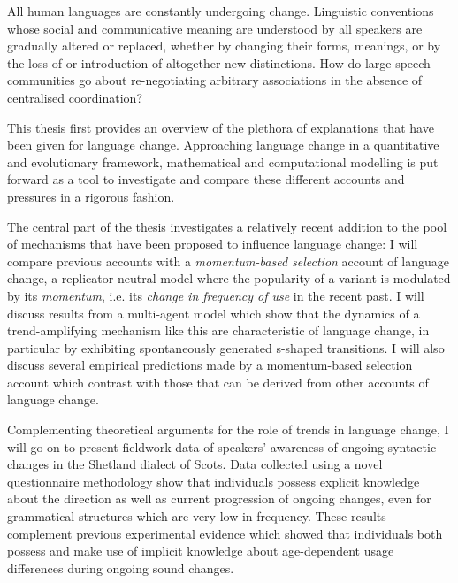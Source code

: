 All human languages are constantly undergoing change. Linguistic conventions whose social and communicative meaning are understood by all speakers are gradually altered or replaced, whether by changing their forms, meanings, or by the loss of or introduction of altogether new distinctions. How do large speech communities go about re-negotiating arbitrary associations in the absence of centralised coordination?

This thesis first provides an overview of the plethora of explanations that have been given for language change. %
Approaching language change in a quantitative and evolutionary framework, mathematical and computational modelling is put forward as a tool to investigate and compare these different accounts and pressures in a rigorous fashion.

The central part of the thesis investigates a relatively recent addition to the pool of mechanisms that have been proposed to influence language change: I will compare previous accounts with a \emph{momentum-based selection} account of language change, a replicator-neutral model where the popularity of a variant is modulated by its \emph{momentum}, i.e. its \emph{change in frequency of use} in the recent past. I will discuss results from a multi-agent model which show that the dynamics of a trend-amplifying mechanism like this are characteristic of language change, in particular by exhibiting spontaneously generated s-shaped transitions. I will also discuss several empirical predictions made by a momentum-based selection account which contrast with those that can be derived from other accounts of language change.

Complementing theoretical arguments for the role of trends in language change, I will go on to present fieldwork data of speakers' awareness of ongoing syntactic changes in the Shetland dialect of Scots. Data collected using a novel questionnaire methodology show that individuals possess explicit knowledge about the direction as well as current progression of ongoing changes, even for grammatical structures which are very low in frequency. These results complement previous experimental evidence which showed that individuals both possess and make use of implicit knowledge about age-dependent usage differences during ongoing sound changes.%

